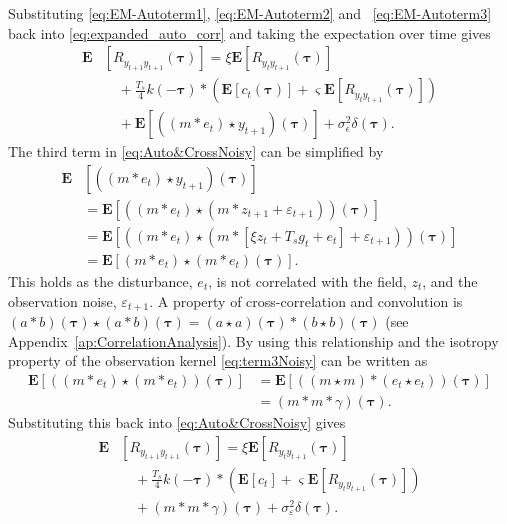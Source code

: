 \documentclass[10pt,twocolumn,twoside]{IEEEtran}
\begin{document}
Substituting \eqref{eq:EM-Autoterm1}, \eqref{eq:EM-Autoterm2} and ~\eqref{eq:EM-Autoterm3} back into \eqref{eq:expanded_auto_corr} and taking the expectation over time  gives
\begin{align}\label{eq:Auto&CrossNoisy}
	\mathbf{E}&[R_{y_{t+1}y_{t+1}}(\boldsymbol{\tau})] = \xi \mathbf{E}[R_{y_ty_{t+1}}(\boldsymbol{\tau})] \nonumber \\
	&\quad+  \frac{T_s}{4} k(-\boldsymbol\tau) \ast (\mathbf{E}\left[c_t(\boldsymbol\tau)\right] + \varsigma \mathbf{E}\left[R_{y_ty_{t+1}}(\boldsymbol\tau)\right] ) \nonumber \\
	&\quad+\mathbf{E}[((m\ast e_t)\star y_{t+1})(\boldsymbol\tau)]+\sigma_{\epsilon}^2\delta(\boldsymbol{\tau}).
\end{align}
The third term in \eqref{eq:Auto&CrossNoisy} can be simplified by 
\begin{align}\label{eq:term3Noisy}
\mathbf{E}&[((m\ast e_t)\star y_{t+1})(\boldsymbol\tau)] \nonumber \\
  &=\mathbf{E}[((m\ast e_t)\star (m\ast z_{t+1}+\varepsilon_{t+1})) (\boldsymbol\tau)] \nonumber \\
	&= \mathbf{E}[(\left(m \ast e_t\right) \star (m \ast [\xi z_t+ T_s g_t + e_t]+\varepsilon_{t+1}))(\boldsymbol\tau)] \nonumber \\
	&=\mathbf{E}[\left(m \ast e_t\right)\star\left(m \ast e_t\right)(\boldsymbol\tau)].
\end{align} 
This holds as the disturbance, $e_t$, is not correlated with the field, $z_t$, and the observation noise, $\varepsilon_{t+1}$. A property of cross-correlation and convolution is $(a \ast b)(\boldsymbol\tau) \star (a \ast b)(\boldsymbol\tau)=(a \star a)(\boldsymbol\tau)\ast(b \star b)(\boldsymbol\tau)$ (see Appendix~\ref{ap:CorrelationAnalysis}). By using this relationship and the isotropy property of the observation kernel \eqref{eq:term3Noisy} can be written as
\begin{align}\label{eq:EM-Autoterm4}
\mathbf{E}[(\left(m \ast e_t\right)\star\left(m \ast e_t\right))(\boldsymbol\tau)]&=\mathbf{E}[(\left(m \star m\right)\ast\left(e_t \star e_t\right))(\boldsymbol\tau)] \nonumber \\
&=(m\ast m \ast \gamma)(\boldsymbol\tau).
\end{align}
Substituting this back into \eqref{eq:Auto&CrossNoisy}  gives
\begin{align}
	\mathbf{E}&[R_{y_{t+1}y_{t+1}}(\boldsymbol{\tau})] = \xi \mathbf{E}[R_{y_ty_{t+1}}(\boldsymbol{\tau})] \nonumber \\
	&\quad+  \frac{T_s}{4} k(-\boldsymbol\tau) \ast (\mathbf{E}\left[c_t\right] + \varsigma \mathbf{E}\left[R_{y_ty_{t+1}}(\boldsymbol\tau)\right] ) \nonumber \\
	&\quad+(m\ast m \ast \gamma)(\boldsymbol\tau)+\sigma_{\varepsilon}^2\delta(\boldsymbol{\tau}).
\end{align}
\end{document}

